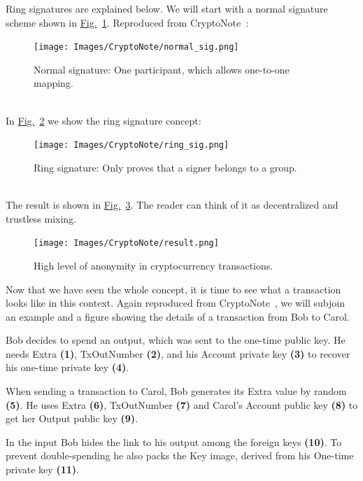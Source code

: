 Ring signatures are explained below. We will start with a normal signature scheme shown in \hyperref[fig:normal_sig]{Fig.}~\ref{fig:normal_sig}. Reproduced from CryptoNote~\cite{cryptonote}:\\
\begin{figure}[ht]
  \centering
  \texttt{[image: Images/CryptoNote/normal\_sig.png]}
  \caption{Normal signature: One participant, which allows one-to-one mapping.}
  \label{fig:normal_sig}
\end{figure}\\
In \hyperref[fig:ring_sig]{Fig.}~\ref{fig:ring_sig} we show the ring signature concept:\\
\begin{figure}[ht]
  \centering
  \texttt{[image: Images/CryptoNote/ring\_sig.png]}
  \caption{Ring signature: Only proves that a signer belongs to a group.}
  \label{fig:ring_sig}
\end{figure}\\
The result is shown in \hyperref[fig:result]{Fig.}~\ref{fig:result}. The reader can think of it as decentralized and trustless mixing.
\begin{figure}[ht]
  \centering
  \texttt{[image: Images/CryptoNote/result.png]}
  \caption{High level of anonymity in cryptocurrency transactions.}
  \label{fig:result}
\end{figure}

Now that we have seen the whole concept, it is time to see what a transaction looks like in this context. Again reproduced from CryptoNote~\cite{cryptonote}, we will subjoin an example and a figure showing the details of a transaction from Bob to Carol.

Bob decides to spend an output, which was sent to the one-time public key. He needs Extra \textbf{(1)}, TxOutNumber \textbf{(2)}, and his Account private key \textbf{(3)} to recover his one-time private key \textbf{(4)}.

When sending a transaction to Carol, Bob generates its Extra value by random \textbf{(5)}. He uses Extra \textbf{(6)}, TxOutNumber \textbf{(7)} and Carol's Account public key \textbf{(8)} to get her Output public key \textbf{(9)}.

In the input Bob hides the link to his output among the foreign keys \textbf{(10)}. To prevent double-spending he also packs the Key image, derived from his One-time private key \textbf{(11)}.

